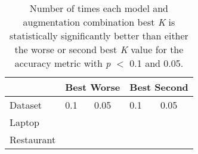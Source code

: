 \documentclass[11pt,a4paper]{article}
\begin{document}
\begin{table}[]
\begin{tabular}{|l|p{1cm}|p{1cm}|p{1cm}|p{1cm}|}
\hline
 &  \multicolumn{2}{l|}{Best Worse} & \multicolumn{2}{l|}{Best Second}  \\ 
\hline
Dataset &  0.1 & 0.05 & 0.1 & 0.05 \\ \hline
Laptop &  &  &  &  \\ \hline
Restaurant &  &  &  &  \\ \hline
\end{tabular}
\caption{Number of times each model and augmentation combination best \textit{K} is statistically significantly better than either the worse or second best \textit{K} value for the accuracy metric with \textit{p} $<$ 0.1 and 0.05.}
\end{table}
\end{document}
